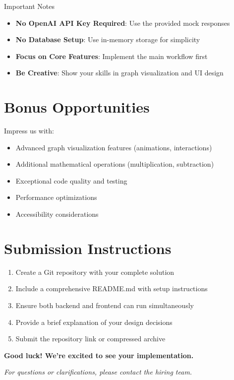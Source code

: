 \documentclass[11pt,a4paper]{article}
\begin{document}
\begin{infobox}{Important Notes}
\begin{itemize}
    \item \textbf{No OpenAI API Key Required}: Use the provided mock responses
    \item \textbf{No Database Setup}: Use in-memory storage for simplicity
    \item \textbf{Focus on Core Features}: Implement the main workflow first
    \item \textbf{Be Creative}: Show your skills in graph visualization and UI design
\end{itemize}
\end{infobox}

\section{Bonus Opportunities}

Impress us with:
\begin{itemize}
    \item Advanced graph visualization features (animations, interactions)
    \item Additional mathematical operations (multiplication, subtraction)
    \item Exceptional code quality and testing
    \item Performance optimizations
    \item Accessibility considerations
\end{itemize}

\section{Submission Instructions}

\begin{enumerate}
    \item Create a Git repository with your complete solution
    \item Include a comprehensive README.md with setup instructions
    \item Ensure both backend and frontend can run simultaneously
    \item Provide a brief explanation of your design decisions
    \item Submit the repository link or compressed archive
\end{enumerate}

\vspace{1cm}

\begin{center}
\textcolor{primaryblue}{\textbf{\Large Good luck! We're excited to see your implementation.}}
\end{center}

\vspace{0.5cm}

\begin{center}
\textit{For questions or clarifications, please contact the hiring team.}
\end{center}
\end{document}

